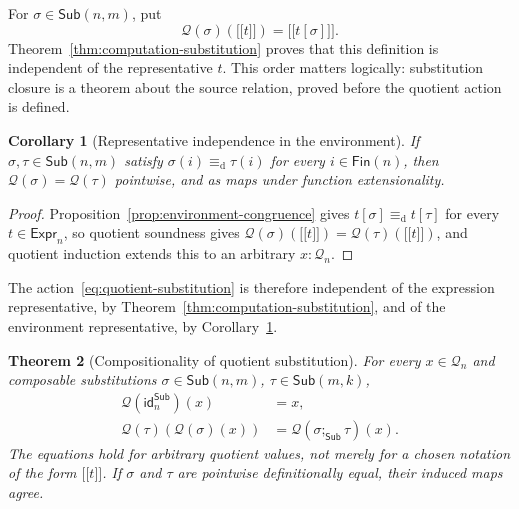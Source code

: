 \documentclass[10pt,reqno]{amsart}
\newtheorem{theorem}{Theorem}[section]
\newtheorem{corollary}[theorem]{Corollary}
\newcommand{\Fin}{\mathsf{Fin}}
\newcommand{\Expr}{\mathsf{Expr}}
\newcommand{\Sub}{\mathsf{Sub}}
\newcommand{\den}[1]{\mathopen{\lbrack\!\lbrack}#1\mathclose{\rbrack\!\rbrack}}
\newcommand{\defeq}{\mathrel{\equiv_{\mathrm d}}}
\newcommand{\idren}{\mathsf{id}}
\newcommand{\Q}{\mathcal{Q}}
\begin{document}
For \(\sigma\in\Sub(n,m)\), put
\[
       \Q(\sigma)(\den t)=\den{t[\sigma]}.
\tag{7.2}\label{eq:quotient-substitution}
\]
Theorem~\ref{thm:computation-substitution} proves that this definition is
independent of the representative \(t\).  This order matters logically:
substitution closure is a theorem about the source relation, proved before
the quotient action is defined.

\begin{corollary}[Representative independence in the environment]
\label{cor:quotient-environment}
If \(\sigma,\tau\in\Sub(n,m)\) satisfy \(\sigma(i)\defeq\tau(i)\) for every
\(i\in\Fin(n)\), then \(\Q(\sigma)=\Q(\tau)\) pointwise, and as maps under
function extensionality.
\end{corollary}

\begin{proof}
Proposition~\ref{prop:environment-congruence} gives \(t[\sigma]\defeq t[\tau]\)
for every \(t\in\Expr_n\), so quotient soundness gives
\(\Q(\sigma)(\den t)=\Q(\tau)(\den t)\), and quotient induction extends this to
an arbitrary \(x:\Q_n\).
\end{proof}

The action~\eqref{eq:quotient-substitution} is therefore independent of the
expression representative, by Theorem~\ref{thm:computation-substitution}, and of
the environment representative, by Corollary~\ref{cor:quotient-environment}.

\begin{theorem}[Compositionality of quotient substitution]
\label{thm:quotient-compositionality}
For every \(x\in\Q_n\) and composable substitutions
\(\sigma\in\Sub(n,m)\), \(\tau\in\Sub(m,k)\),
\[
\begin{aligned}
\Q(\idren^{\Sub}_n)(x)&=x,\\
\Q(\tau)(\Q(\sigma)(x))&=\Q(\sigma;_{\Sub}\tau)(x).
\end{aligned}
\tag{7.3}\label{eq:quotient-compositionality}
\]
The equations hold for arbitrary quotient values, not merely for a chosen
notation of the form \(\den t\).  If \(\sigma\) and \(\tau\) are pointwise
definitionally equal, their induced maps agree.
\end{theorem}
\end{document}
